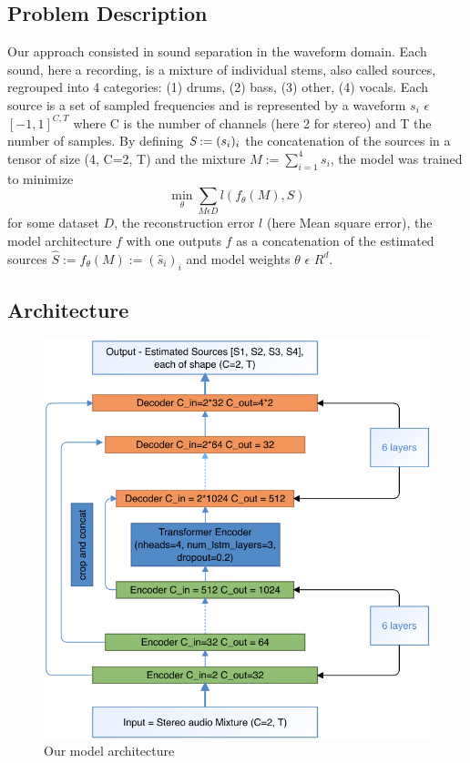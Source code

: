 \documentclass[final]{cvpr}
\begin{document}
\subsection{Problem Description}
Our approach consisted in sound separation in the waveform domain. Each sound, here a recording, is a mixture of individual stems, also called sources, regrouped into 4 categories: (1) drums, (2) bass, (3) other, (4) vocals. Each source is a set of sampled frequencies and is represented by a waveform $s_i$ $\epsilon$ ${[-1, 1]}^{C,T}$ where C is the number of channels (here 2 for stereo) and T the number of samples. By defining $\emph{S}:= (s_i)_i$ the concatenation of the sources in a tensor of size (4, C=2, T) and the mixture $M:= \sum^4_{i=1} {s_i}$, the model was trained to minimize
\begin{equation}
\min_{\theta} \sum_{M \epsilon D} l(f_{\theta}(M), S)
\end{equation}
for some dataset $D$, the reconstruction error $l$ (here Mean square error), the model architecture $f$ with one outputs $f$ as a concatenation of the estimated sources $\hat{S}:=f_{\theta}(M):=({\hat{s}_i})_i$ and model weights $\theta$ $\epsilon$ $R^{d}$.

\subsection{Architecture}

\begin{figure}
   \includegraphics[scale=0.3]{architecture.png}
   \caption{Our model architecture}
   \label{our-architecture}
\end{figure}
\end{document}
